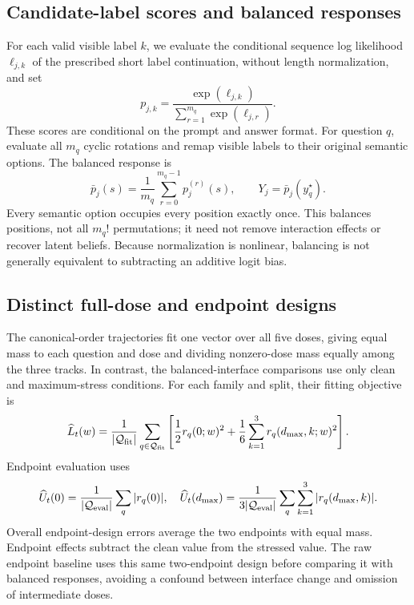 \subsection{Candidate-label scores and balanced responses}
For each valid visible label $k$, we evaluate the conditional sequence log likelihood $\ell_{j,k}$ of the prescribed short label continuation, without length normalization, and set
\begin{equation}
p_{j,k}=\frac{\exp(\ell_{j,k})}{\sum_{r=1}^{m_q}\exp(\ell_{j,r})}.
\end{equation}
These scores are conditional on the prompt and answer format. For question $q$, evaluate all $m_q$ cyclic rotations and remap visible labels to their original semantic options. The balanced response is
\begin{equation}
\bar p_j(s)=\frac1{m_q}\sum_{r=0}^{m_q-1}p_j^{(r)}(s),
\qquad Y_j=\bar p_j(y_q^\star).
\end{equation}
Every semantic option occupies every position exactly once. This balances positions, not all $m_q!$ permutations; it need not remove interaction effects or recover latent beliefs. Because normalization is nonlinear, balancing is not generally equivalent to subtracting an additive logit bias.

\subsection{Distinct full-dose and endpoint designs}
The canonical-order trajectories fit one vector over all five doses, giving equal mass to each question and dose and dividing nonzero-dose mass equally among the three tracks. In contrast, the balanced-interface comparisons use only clean and maximum-stress conditions. For each family and split, their fitting objective is
\begin{equation}
\widehat L_t(w)=\frac1{|\mathcal Q_{\rm fit}|}\sum_{q\in\mathcal Q_{\rm fit}}
\left[\frac12 r_q(0;w)^2+
\frac16\sum_{k=1}^3r_q(d_{\max},k;w)^2\right].
\end{equation}
Endpoint evaluation uses
\begin{equation}
\widehat U_t(0)=\frac1{|\mathcal Q_{\rm eval}|}\sum_q|r_q(0)|,
\quad
\widehat U_t(d_{\max})=\frac1{3|\mathcal Q_{\rm eval}|}\sum_q\sum_{k=1}^3|r_q(d_{\max},k)|.
\end{equation}
Overall endpoint-design errors average the two endpoints with equal mass. Endpoint effects subtract the clean value from the stressed value. The raw endpoint baseline uses this same two-endpoint design before comparing it with balanced responses, avoiding a confound between interface change and omission of intermediate doses.

